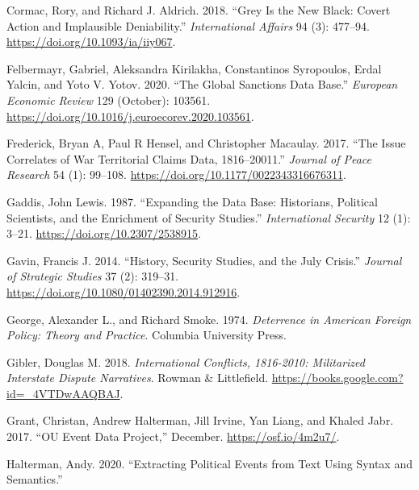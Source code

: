 \documentclass{article}
\newlength{\cslhangindent}
\newlength{\cslentryspacingunit} %
\newenvironment{CSLReferences}[2] %
 {%
  \setlength{\parindent}{0pt}
  \ifodd #1
  \let\oldpar\par
  \def\par{\hangindent=\cslhangindent\oldpar}
  \fi
  \setlength{\parskip}{#2\cslentryspacingunit}
 }%
 {}
\begin{document}
\begin{CSLReferences}{1}{0}
\leavevmode{}%
Cormac, Rory, and Richard J. Aldrich. 2018. {``Grey Is the New Black:
Covert Action and Implausible Deniability.''} \emph{International
Affairs} 94 (3): 477--94. \url{https://doi.org/10.1093/ia/iiy067}.

\leavevmode{}%
Felbermayr, Gabriel, Aleksandra Kirilakha, Constantinos Syropoulos,
Erdal Yalcin, and Yoto V. Yotov. 2020. {``The Global Sanctions Data
Base.''} \emph{European Economic Review} 129 (October): 103561.
\url{https://doi.org/10.1016/j.euroecorev.2020.103561}.

\leavevmode{}%
Frederick, Bryan A, Paul R Hensel, and Christopher Macaulay. 2017.
{``The {Issue Correlates} of {War Territorial Claims Data},
1816--20011.''} \emph{Journal of Peace Research} 54 (1): 99--108.
\url{https://doi.org/10.1177/0022343316676311}.

\leavevmode{}%
Gaddis, John Lewis. 1987. {``Expanding the {Data Base}: {Historians},
{Political Scientists}, and the {Enrichment} of {Security Studies}.''}
\emph{International Security} 12 (1): 3--21.
\url{https://doi.org/10.2307/2538915}.

\leavevmode{}%
Gavin, Francis J. 2014. {``History, {Security Studies}, and the {July
Crisis}.''} \emph{Journal of Strategic Studies} 37 (2): 319--31.
\url{https://doi.org/10.1080/01402390.2014.912916}.

\leavevmode{}%
George, Alexander L., and Richard Smoke. 1974. \emph{Deterrence in
{American} Foreign Policy: {Theory} and Practice}. {Columbia University
Press}.

\leavevmode{}%
Gibler, Douglas M. 2018. \emph{International {Conflicts}, 1816-2010:
{Militarized Interstate Dispute Narratives}}. {Rowman \& Littlefield}.
\url{https://books.google.com?id=_4VTDwAAQBAJ}.

\leavevmode{}%
Grant, Christan, Andrew Halterman, Jill Irvine, Yan Liang, and Khaled
Jabr. 2017. {``{OU Event Data Project},''} December.
\url{https://osf.io/4m2u7/}.

\leavevmode{}%
Halterman, Andy. 2020. {``Extracting {Political Events} from {Text Using
Syntax} and {Semantics}.''}


\end{CSLReferences}
\end{document}
